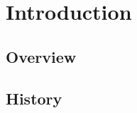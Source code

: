 \chapter{Introduction}
\label{chapter: introduction}
\setlength{\parskip}{12pt}


\section{Overview}

\section{History}









